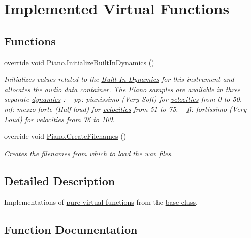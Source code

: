 \hypertarget{group___piano_virt_func}{}\section{Implemented Virtual Functions}
\label{group___piano_virt_func}
\subsection*{Functions}
\begin{DoxyCompactItemize}
\item 
override void \hyperlink{group___piano_virt_func_ga6bc02528f8808b8a30aa7d5776445a6d}{Piano.\+Initialize\+Built\+In\+Dynamics} ()
\begin{DoxyCompactList}\small\item\em Initializes values related to the \hyperlink{group___audio_DefBID}{Built-\/\+In Dynamics} for this instrument and allocates the audio data container. The \hyperlink{class_piano}{Piano} samples are available in three separate \hyperlink{group___audio_DefBID}{dynamics} \+: ~\newline
 pp\+: pianissimo (Very Soft) for \hyperlink{group___audio_DefVel}{velocities} from 0 to 50. ~\newline
 mf\+: mezzo-\/forte (Half-\/loud) for \hyperlink{group___audio_DefVel}{velocities} from 51 to 75. ~\newline
 ff\+: fortissimo (Very Loud) for \hyperlink{group___audio_DefVel}{velocities} from 76 to 100. \end{DoxyCompactList}\item 
override void \hyperlink{group___piano_virt_func_gaafd50f0f04ea7ea4f560accc628b8f1b}{Piano.\+Create\+Filenames} ()
\begin{DoxyCompactList}\small\item\em Creates the filenames from which to load the wav files. \end{DoxyCompactList}\end{DoxyCompactItemize}


\subsection{Detailed Description}
Implementations of \hyperlink{group___v_i_base_virt_func}{pure virtual functions} from the \hyperlink{group___v_i_base}{base class}. 

\subsection{Function Documentation}
\mbox{\label{group___piano_virt_func_gaafd50f0f04ea7ea4f560accc628b8f1b}} 
